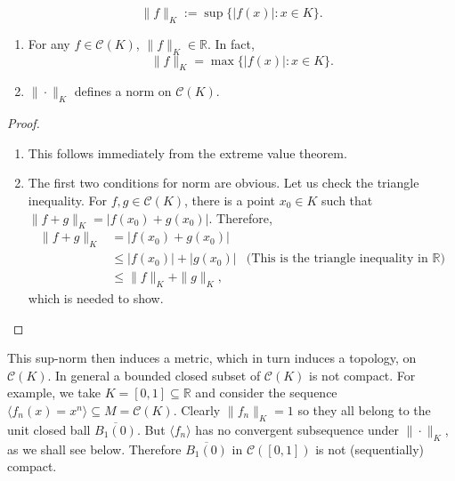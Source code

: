 \begin{equation*}
  \| f \|_K := \sup \{ |f(x)| \colon x \in K \}.
\end{equation*}

\begin{thm}
  \label{thm:max-norm}
  \begin{enumerate}[(1)]
    \item For any $f \in \mathcal{C}(K)$, $\| f \|_K \in \mathbb{R}$.
      In fact, 
      \begin{equation}
	\label{eq:max-norm}
	\| f \|_K = \max \{ |f(x)| \colon x \in K \}.
      \end{equation}
    \item $\| \cdot \|_K$ defines a norm on $\mathcal{C}(K)$.
  \end{enumerate}
\end{thm}

\begin{proof}
  \begin{enumerate}[(1)]
    \item This follows immediately from the extreme value theorem.

    \item The first two conditions for norm are obvious.
      Let us check the triangle inequality.
      For $f, g \in \mathcal{C}(K)$, there is a point $x_0 \in K$ such that $\| f + g \|_K = |f(x_0) + g(x_0)|$.  Therefore,
      \begin{align*}
	\| f + g \|_K &= |f(x_0) + g(x_0)| \\
	&\leqslant |f(x_0)| + |g(x_0)| & \text{(This is the triangle inequality in $\mathbb{R}$)} \\
	&\leqslant \| f \|_K + \| g \|_K,
      \end{align*}
      which is needed to show.
  \end{enumerate}  
\end{proof}

This sup-norm then induces a metric, which in turn induces a topology, on $\mathcal{C}(K)$.
In general a bounded closed subset of $\mathcal{C}(K)$ is not compact.
For example, we take $K = [0,1] \subseteq \mathbb R$ and consider the sequence $\langle f_n(x) = x^n \rangle \subseteq M = \mathcal{C}(K)$.
Clearly $\| f_n \|_K = 1$ so they all belong to the unit closed ball $\overline{B_1(0)}$.
But $\langle f_n \rangle$ has no convergent subsequence under $\| \cdot \|_K$, as we shall see below.
Therefore $\overline{B_1(0)}$ in $\mathcal{C}([0,1])$ is not (sequentially) compact.

